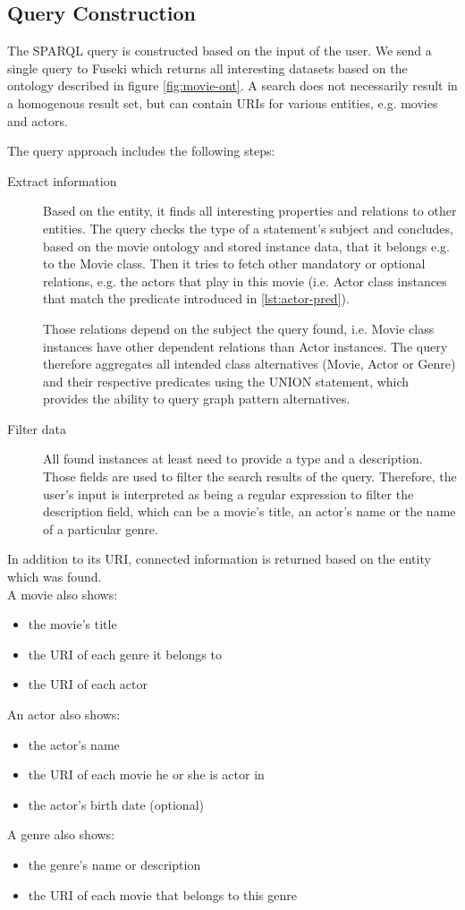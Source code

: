 \subsection{Query Construction}
The SPARQL query is constructed based on the input of the user. We send a single query to Fuseki which returns all interesting datasets based on the ontology described in figure \ref{fig:movie-ont}. A search does not necessarily result in a homogenous result set, but can contain URIs for various entities, e.g. movies and actors.

The query approach includes the following steps:
\begin{description}  
\item[Extract information]
Based on the entity, it finds all interesting properties and relations to other entities. The query checks the type of a statement's subject and concludes, based on the movie ontology and stored instance data, that it belongs e.g. to the Movie class. Then it tries to fetch other mandatory or optional relations, e.g. the actors that play in this movie (i.e. Actor class instances that match the predicate introduced in \ref{lst:actor-pred}).

Those relations depend on the subject the query found, i.e. Movie class instances have other dependent relations than Actor instances. The query therefore aggregates all intended class alternatives (Movie, Actor or Genre) and their respective predicates using the UNION statement, which provides the ability to query graph pattern alternatives. %
\item[Filter data]
All found instances at least need to provide a type and a description. Those fields are used to filter the search results of the query. Therefore, the user's input is interpreted as being a regular expression to filter the description field, which can be a movie's title, an actor's name or the name of a particular genre.
\end{description}

In addition to its URI, connected information is returned based on the entity which was found.\\
A movie also shows:
\begin{itemize}
\item the movie's title
\item the URI of each genre it belongs to
\item the URI of each actor
\end{itemize}
An actor also shows:
\begin{itemize}
\item the actor's name
\item the URI of each movie he or she is actor in
\item the actor's birth date (optional)
\end{itemize}
A genre also shows:
\begin{itemize}
\item the genre's name or description
\item the URI of each movie that belongs to this genre
\end{itemize}

